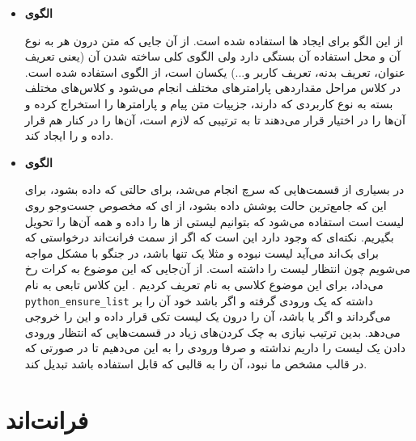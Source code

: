 \begin{itemize}
	\item
	\textbf{الگوی }
	
	از این الگو برای ایجاد  ها استفاده شده است. از آن جایی که متن درون هر  به نوع آن  و محل استفاده آن بستگی دارد ولی الگوی کلی ساخته شدن آن (یعنی تعریف عنوان، تعریف بدنه، تعریف کاربر و...) یکسان است، از الگوی  استفاده شده است. در کلاس  مراحل مقداردهی پارامترهای مختلف  انجام می‌شود و کلاس‌های مختلف  بسته به نوع کاربردی که دارند، جزییات متن پیام و پارامترها را استخراج کرده و آن‌‌ها را در اختیار  قرار می‌دهند تا به ترتیبی که لازم است، آن‌ها را در کنار هم قرار داده و  را ایجاد کند.
	
	
	\item
	\textbf{الگوی }
	
	در بسیاری از قسمت‌هایی که سرچ انجام می‌شد، برای حالتی که  داده بشود، برای این که جامع‌ترین حالت پوشش داده بشود، از  ای که مخصوص جست‌وجو روی لیست است استفاده می‌شود که بتوانیم لیستی از  ها را داده و همه آن‌ها را تحویل بگیریم. نکته‌ای که وجود دارد این است که اگر از سمت فرانت‌اند درخواستی که برای بک‌اند می‌آید لیست نبوده و مثلا یک  تنها باشد، در  جنگو با مشکل مواجه می‌شویم چون انتظار لیست را داشته است. از آن‌جایی که این موضوع به کرات رخ می‌داد، برای این موضوع کلاسی به نام  تعریف کردیم . این کلاس تابعی به نام \verb+python_ensure_list+  داشته که یک ورودی گرفته و اگر  باشد خود آن را بر می‌گرداند و اگر  یا  باشد، آن‌ را درون یک لیست تکی قرار داده و این  را خروجی می‌دهد. بدین ترتیب نیازی به چک کردن‌های زیاد در قسمت‌هایی که انتظار ورودی دادن یک لیست را داریم نداشته و صرفا ورودی را به این  می‌دهیم تا در صورتی که در قالب مشخص ما نبود، آن را به قالبی که قابل استفاده باشد تبدیل کند.
	
	
	
\end{itemize}

\newpage

\section{فرانت‌اند}
\label{designpattern:front}
